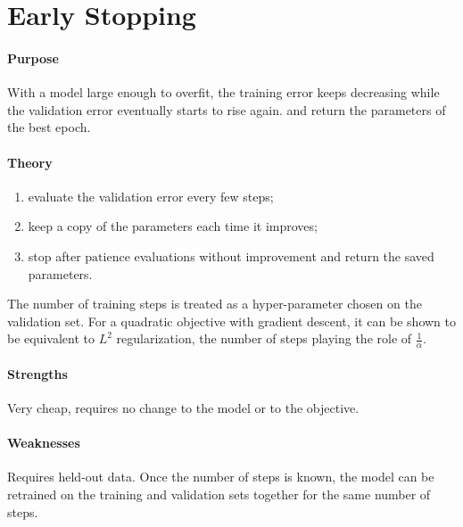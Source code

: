 \section{Early Stopping}
\paragraph{Purpose}
With a model large enough to overfit, the training error keeps decreasing while the
validation error eventually starts to rise again.  and return the parameters of the best epoch.

\paragraph{Theory}
\begin{enumerate}
    \item evaluate the validation error every few steps;
    \item keep a copy of the parameters each time it improves;
    \item stop after $\text{patience}$ evaluations without improvement and return the
        saved parameters.
\end{enumerate}
The number of training steps is treated as a hyper-parameter chosen on the validation
set. For a quadratic objective with gradient descent, it can be shown to be equivalent to
$L^{2}$ regularization, the number of steps playing the role of $\frac{1}{\alpha}$.

\paragraph{Strengths}
Very cheap, requires no change to the model or to the objective.

\paragraph{Weaknesses}
Requires held-out data. Once the number of steps is known, the model can be retrained on
the training and validation sets together for the same number of steps.
